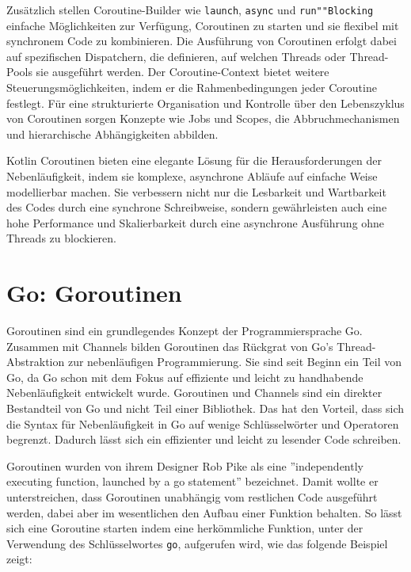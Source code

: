 \documentclass[fontsize=12pt,paper=a4,twoside=semi,parskip=half-,headsepline,headinclude]{scrreprt}
\begin{document}
Zusätzlich stellen Coroutine-Builder wie \texttt{launch}, \texttt{async} und \texttt{run""Blocking} einfache Mög\-lich\-kei\-ten zur Verfügung, Coroutinen zu starten und sie flexibel mit synchronem Code zu kombinieren. Die Ausführung von Coroutinen erfolgt dabei auf spezifischen Dispatchern, die definieren, auf welchen Threads oder Thread-Pools sie ausgeführt werden. Der Coroutine-Context bietet weitere Steuerungsmöglichkeiten, indem er die Rahmenbedingungen jeder Coroutine festlegt. Für eine strukturierte Organisation und Kontrolle über den Lebenszyklus von Coroutinen sorgen Konzepte wie Jobs und Scopes, die Abbruchmechanismen und hierarchische Abhängigkeiten abbilden.

Kotlin Coroutinen bieten eine elegante Lösung für die Herausforderungen der Ne\-ben\-läu\-fig\-keit, indem sie komplexe, asynchrone Abläufe auf einfache Weise modellierbar machen. Sie verbessern nicht nur die Lesbarkeit und Wartbarkeit des Codes durch eine synchrone Schreibweise, sondern gewährleisten auch eine hohe Performance und Skalierbarkeit durch eine asynchrone Ausführung ohne Threads zu blockieren.

\newpage

\section{Go: Goroutinen}

Goroutinen sind ein grundlegendes Konzept der Programmiersprache Go. Zusammen mit Channels bilden Goroutinen das Rückgrat von Go's Thread-Abstraktion zur nebenläufigen Programmierung. Sie sind seit Beginn ein Teil von Go, da Go schon mit dem Fokus auf effiziente und leicht zu handhabende Nebenläufigkeit entwickelt wurde. Goroutinen und Channels sind ein direkter Bestandteil von Go und nicht Teil einer Bibliothek. Das hat den Vorteil, dass sich die Syntax für Nebenläufigkeit in Go auf wenige Schlüsselwörter und Operatoren begrenzt. Dadurch lässt sich ein effizienter und leicht zu lesender Code schreiben.

Goroutinen wurden von ihrem Designer Rob Pike als eine ''independently executing function, launched by a go statement''\cite{Pike2012} bezeichnet. Damit wollte er unterstreichen, dass Goroutinen unabhängig vom restlichen Code ausgeführt werden, dabei aber im wesentlichen den Aufbau einer Funktion behalten. So lässt sich eine Goroutine starten indem eine herkömmliche Funktion, unter der Verwendung des Schlüsselwortes \texttt{go}, aufgerufen wird, wie das folgende Beispiel zeigt:
\end{document}

